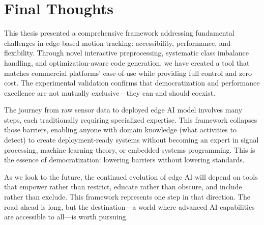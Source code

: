 \section{Final Thoughts}

This thesis presented a comprehensive framework addressing fundamental challenges in edge-based motion tracking: accessibility, performance, and flexibility. Through novel interactive preprocessing, systematic class imbalance handling, and optimization-aware code generation, we have created a tool that matches commercial platforms' ease-of-use while providing full control and zero cost. The experimental validation confirms that democratization and performance excellence are not mutually exclusive—they can and should coexist.

The journey from raw sensor data to deployed edge AI model involves many steps, each traditionally requiring specialized expertise. This framework collapses those barriers, enabling anyone with domain knowledge (what activities to detect) to create deployment-ready systems without becoming an expert in signal processing, machine learning theory, or embedded systems programming. This is the essence of democratization: lowering barriers without lowering standards.

As we look to the future, the continued evolution of edge AI will depend on tools that empower rather than restrict, educate rather than obscure, and include rather than exclude. This framework represents one step in that direction. The road ahead is long, but the destination—a world where advanced AI capabilities are accessible to all—is worth pursuing.